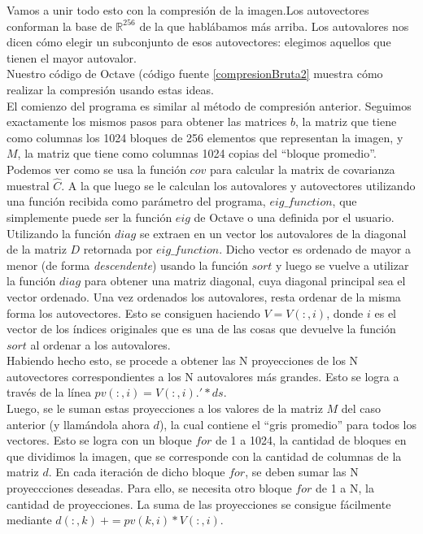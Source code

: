 \documentclass[twocolumn,a4paper,10pt]{article}
\begin{document}
Vamos a unir todo esto con la compresi\'on de la imagen.Los autovectores conforman la base de $\mathbb{R}^{256}$ de la que habl\'abamos m\'as arriba. 
Los autovalores nos dicen c\'omo elegir un subconjunto de esos autovectores: elegimos aquellos que tienen el mayor autovalor. \\

Nuestro c\'odigo de Octave (c\'odigo fuente \ref{compresionBruta2} muestra c\'omo realizar la compresi\'on usando estas ideas. \\

El comienzo del programa es similar al m\'etodo de compresi\'on anterior. Seguimos exactamente los mismos pasos para obtener las matrices $b$, la matriz que tiene como 
columnas los 1024 bloques de 256 elementos que representan la imagen, y $M$, la matriz que tiene como columnas 1024 copias del ``bloque promedio''.\\ 

Podemos ver como se usa la función $cov$ para calcular la matrix de covarianza muestral $\widehat{C}$. A la que luego se le calculan los autovalores y autovectores
utilizando una funci\'on recibida como par\'ametro del programa, $eig\_function$, que simplemente puede ser la funci\'on $eig$ de Octave o una definida por el usuario.
Utilizando la función $diag$ se extraen en un vector los autovalores de la diagonal de la matriz $D$ retornada por $eig\_function$. Dicho vector es ordenado de 
mayor a menor (de forma \textit{descendente}) usando la funci\'on $sort$ y luego se vuelve a utilizar la funci\'on $diag$ para obtener una matriz diagonal, cuya 
diagonal principal sea el vector ordenado. Una vez ordenados los autovalores, resta ordenar de la misma forma los autovectores. Esto se consiguen haciendo $V = V(:,i)$,
donde $i$ es el vector de los \'indices originales que es una de las cosas que devuelve la funci\'on $sort$ al ordenar a los autovalores.\\

Habiendo hecho esto, se procede a obtener las N proyecciones de los N autovectores correspondientes a los N autovalores más grandes. Esto se logra a través de la 
l\'inea $pv(:,i) = V(:,i).' * ds$. \\

Luego, se le suman estas proyecciones a los valores de la matriz $M$ del caso anterior (y llam\'andola ahora $d$), la cual contiene el ``gris promedio'' para todos 
los vectores. Esto se logra con un bloque $for$ de 1 a 1024, la cantidad de bloques en que dividimos la imagen, que se corresponde con la cantidad de columnas 
de la matriz $d$. En cada iteración de dicho bloque $for$, se deben sumar las N proyeccciones deseadas. Para ello, se necesita otro bloque $for$ de 1 a N, la cantidad 
de proyecciones. La suma de las proyecciones se consigue f\'acilmente mediante $d(:,k)\: += pv(k,i) * V(:,i)$. \\
\end{document}
